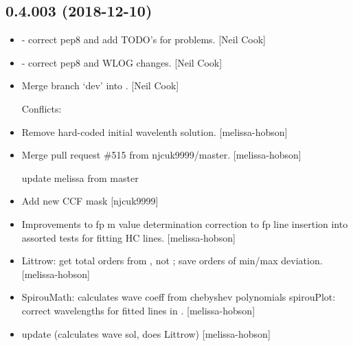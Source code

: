 \documentclass[a4paper,10pt,english]{report}
\begin{document}
\subsection{0.4.003 (2018-12-10)}
\label{\detokenize{misc/changelog:id243}}\begin{itemize}
\item {} 
 - correct pep8 and add TODO’s for problems.
{[}Neil Cook{]}

\item {} 
 - correct pep8 and WLOG changes. {[}Neil
Cook{]}

\item {} 
Merge branch ‘dev’ into . {[}Neil Cook{]}
\begin{description}
\item[{Conflicts:}] \leavevmode
{}

\end{description}

\item {} 
Remove hard-coded initial wavelenth solution. {[}melissa-hobson{]}

\item {} 
Merge pull request \#515 from njcuk9999/master. {[}melissa-hobson{]}

update melissa from master

\item {} 
Add new CCF mask  {[}njcuk9999{]}

\item {} 
Improvements to  fp m value determination
correction to fp line insertion into  assorted tests for
fitting HC lines. {[}melissa-hobson{]}

\item {} 
Littrow: get total orders from , not ; save
orders of min/max deviation. {[}melissa-hobson{]}

\item {} 
SpirouMath: calculates wave coeff from chebyshev polynomials
spirouPlot: correct wavelengths for fitted lines in
. {[}melissa-hobson{]}

\item {} 
 update (calculates wave sol, does Littrow)
{[}melissa-hobson{]}


\end{itemize}
\end{document}
